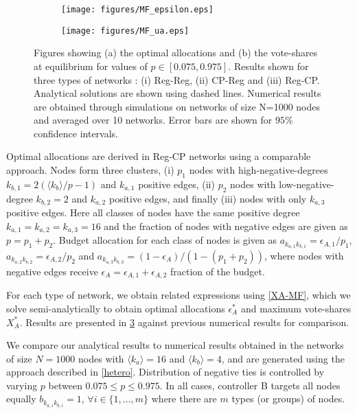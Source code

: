 \begin{figure}
  \begin{subfigure}[b]{0.475\textwidth}
    \texttt{[image: figures/MF\_epsilon.eps]}
    \caption{}
    \label{MF-1}
  \end{subfigure}
  \hspace{1em}
  \begin{subfigure}[b]{0.475\textwidth}
    \texttt{[image: figures/MF\_ua.eps]}
    \caption{}
    \label{MF-2}
  \end{subfigure}
  \caption{Figures showing (a) the optimal allocations and (b) the vote-shares at equilibrium for values of $p \in [0.075,0.975]$. Results shown for three types of networks : (i) Reg-Reg, (ii) CP-Reg and (iii) Reg-CP. Analytical solutions are shown using dashed lines.
  Numerical results are obtained through simulations on networks of size N=1000 nodes and averaged over 10 networks. Error bars are shown for $95\%$ confidence intervals.}
  \label{MF}
\end{figure}

Optimal allocations are derived in Reg-CP networks using a comparable approach. Nodes form three clusters, (i) $p_{1}$ nodes with high-negative-degrees $k_{b,1} = 2(\langle k_{b} \rangle/p -1)$ and $k_{a,1}$ positive edges, (ii) $p_{2}$ nodes with low-negative-degree $k_{b,2} = 2$ and $k_{a,2}$ positive edges, and finally (iii) nodes with only $k_{a,3}$ positive edges. Here all classes of nodes have the same positive degree $k_{a,1} = k_{a,2} = k_{a,3} = 16$ and the fraction of nodes with negative edges are given as $p=p_{1}+p_{2}$. 
Budget allocation for each class of nodes is given as $a_{k_{a,1}k_{b,1}}=\epsilon_{A,1}/p_{1}$, $a_{k_{a,2}k_{b,2}}=\epsilon_{A,2}/p_{2}$ and $a_{k_{a,3}k_{b,3}}=(1 - \epsilon_{A})/(1-(p_{1}+p_{2}))$, where nodes with negative edges receive $\epsilon_{A} = \epsilon_{A,1}+\epsilon_{A,2}$ fraction of the budget.

For each type of network, we obtain related expressions using \cref{XA-MF}, which we solve semi-analytically to obtain optimal allocations $\epsilon_{A}^*$ and maximum vote-shares $X_{A}^*$. Results are presented in \cref{MF} against previous numerical results for comparison. 


We compare our analytical results to numerical results obtained in the networks of size $N=1000$ nodes with $\langle k_{a} \rangle=16$ and $\langle k_{b} \rangle=4$, and are generated using the approach described in \cref{hetero}. Distribution of negative ties is controlled by varying $p$ between $0.075\leq p \leq 0.975$. In all cases, controller B targets all nodes equally $b_{k_{a,i}k_{b,i}} = 1$, $\forall i \in \{1,...,m\}$ where there are $m$ types (or groups) of nodes. 

